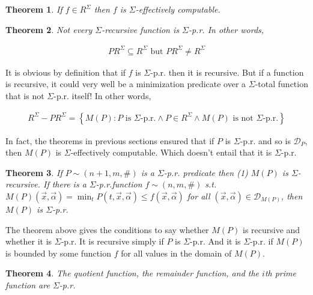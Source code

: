 \documentclass[a4paper, 12pt]{article}
\newtheorem{theorem}{Theorem}
\newtheorem{theorem}{Theorem}
\begin{document}
\begin{theorem}
    If $f \in R^{\Sigma}$ then $f$ is $\Sigma$-effectively computable.
\end{theorem}

\begin{theorem}
    Not every $\Sigma$-recursive function is $\Sigma$-p.r. In other words, 

    \begin{align*}
        PR^{\Sigma} \subseteq R^{\Sigma} \text{ but } PR^{\Sigma} \neq R^{\Sigma}
    \end{align*}
\end{theorem}

It is obvious by definition that if $f$ is $\Sigma$-p.r. then it is recursive.
But if a function is recursive, it could very well be a minimization predicate
over a $\Sigma$-total function that is not $\Sigma$-p.r. itself! In other words, 

\begin{align*}
    R^{\Sigma} - PR^{\Sigma} = \left\{ M(P) : P \text{ is $\Sigma$-p.r.}  \land
    P \in R^{\Sigma} \land M(P) \text{ is not $\Sigma$-p.r.} \right\} 
\end{align*}

In fact, the theorems in previous sections ensured that if $P$ is $\Sigma$-p.r.
and so is $\mathcal{D}_P$, then $M(P)$ is $\Sigma$-effectively computable. Which
doesn't entail that it is $\Sigma$-p.r.

\begin{theorem}
    If $P \sim (n+1, m, \#)$ is a $\Sigma$-p.r. predicate then \textit{(1)} $M(P)$ is
    $\Sigma$-recursive. If there is a $\Sigma$-p.r.function $f \sim (n, m, \#)$
    s.t. $M(P)(\overrightarrow{x}, \overrightarrow{\alpha}) = \min_t P(t,
    \overrightarrow{x},  \overrightarrow{\alpha}) \leq f(\overrightarrow{x},
    \overrightarrow{\alpha})$ for all $(\overrightarrow{x},
    \overrightarrow{\alpha}) \in \mathcal{D}_{M(P)}$, then $M(P)$ is $\Sigma$-p.r.
\end{theorem}

The theorem above gives the conditions to say whether $M(P)$ is recursive and
whether it is $\Sigma$-p.r. It is recursive simply if $P$ is $\Sigma$-p.r. And
it is $\Sigma$-p.r. if $M(P)$ is bounded by some function $f$ for all values in
the domain of $M(P)$. 

\begin{theorem}
    The quotient function, the remainder function, and the $i$th prime function are $\Sigma$-p.r.
\end{theorem}
\end{document}
